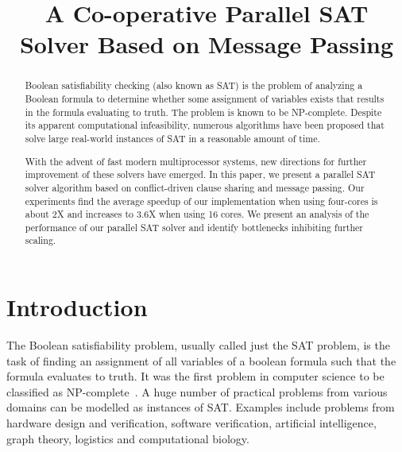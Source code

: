 \documentclass[letterpaper, compsoc, conference]{IEEEtran}
\begin{document}
\title{A Co-operative Parallel SAT Solver Based on Message Passing}

\author{
    \and {}
}
\maketitle
\pagestyle{plain}
\setcounter{page}{1}

\begin{abstract} Boolean satisfiability checking (also known as SAT) is the
problem of analyzing a Boolean formula to determine whether some assignment of
variables exists that results in the formula evaluating to truth. The problem is
known to be NP-complete. Despite its apparent computational infeasibility,
numerous algorithms have been proposed that solve large real-world instances of
SAT in a reasonable amount of time. 

With the advent of fast modern multiprocessor systems, new directions for
further improvement of these solvers have emerged. In this paper, we present a
parallel SAT solver algorithm based on conflict-driven clause sharing and
message passing. Our experiments find the average speedup of our implementation
when using four-cores is about 2X and increases to 3.6X when using 16 cores.
We present an analysis of the performance of our parallel SAT solver and
identify bottlenecks inhibiting further scaling.
\end{abstract}

\section{Introduction}
The Boolean satisfiability problem, usually called just the SAT problem, is the
task of finding an assignment of all variables of a boolean formula such that
the formula evaluates to truth. It was the first problem in computer science to
be classified as NP-complete~\cite{Cook1971}. A huge number of practical
problems from various domains can be modelled as instances of SAT.  Examples
include problems from hardware design and verification, software verification,
artificial intelligence, graph theory, logistics and computational biology. 
\end{document}
